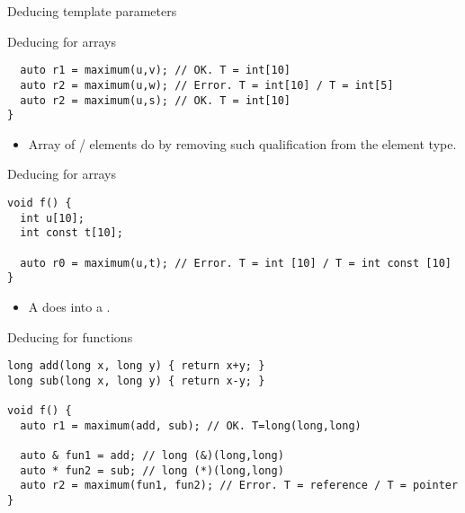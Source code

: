 \begin{frame}{Deducing template parameters}
\begin{block}{Deducing for arrays}
\begin{lstlisting}
  auto r1 = maximum(u,v); // OK. T = int[10]
  auto r2 = maximum(u,w); // Error. T = int[10] / T = int[5]
  auto r2 = maximum(u,s); // OK. T = int[10]
}
\end{lstlisting}
\end{block}

\framebreak

\begin{itemize}
  \item Array of / elements do  
        by removing such qualification from the element type.
\end{itemize}

\begin{block}{Deducing for arrays}
\begin{lstlisting}
void f() {
  int u[10];
  int const t[10]; 

  auto r0 = maximum(u,t); // Error. T = int [10] / T = int const [10]
}
\end{lstlisting}
\end{block}

\framebreak

\begin{itemize}
  \item A  does   into a .
\end{itemize}

\begin{block}{Deducing for functions}
\begin{lstlisting}
long add(long x, long y) { return x+y; }
long sub(long x, long y) { return x-y; }

void f() {
  auto r1 = maximum(add, sub); // OK. T=long(long,long)

  auto & fun1 = add; // long (&)(long,long)
  auto * fun2 = sub; // long (*)(long,long)
  auto r2 = maximum(fun1, fun2); // Error. T = reference / T = pointer
}
\end{lstlisting}
\end{block}

\end{frame}
